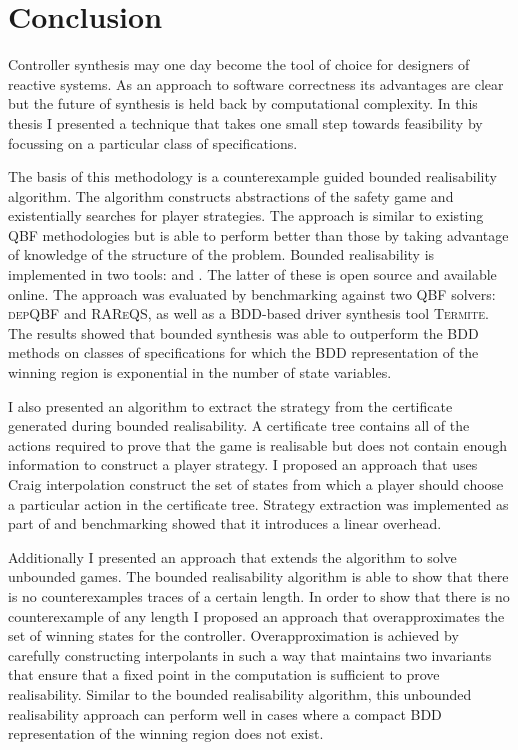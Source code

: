 \chapter{Conclusion}
\label{ch:conclusion}

Controller synthesis may one day become the tool of choice for designers of reactive systems. As an approach to software correctness its advantages are clear but the future of synthesis is held back by computational complexity. In this thesis I presented a technique that takes one small step towards feasibility by focussing on a particular class of specifications.

The basis of this methodology is a counterexample guided bounded realisability algorithm. The algorithm constructs abstractions of the safety game and existentially searches for player strategies. The approach is similar to existing QBF methodologies but is able to perform better than those by taking advantage of knowledge of the structure of the problem. Bounded realisability is implemented in two tools: \eva and \termitesat. The latter of these is open source and available online. The approach was evaluated by benchmarking \eva against two QBF solvers: \textsc{depQBF} and \textsc{RAReQS}, as well as a BDD-based driver synthesis tool \textsc{Termite}. The results showed that bounded synthesis was able to outperform the BDD methods on classes of specifications for which the BDD representation of the winning region is exponential in the number of state variables.

I also presented an algorithm to extract the strategy from the certificate generated during bounded realisability. A certificate tree contains all of the actions required to prove that the game is realisable but does not contain enough information to construct a player strategy. I proposed an approach that uses Craig interpolation construct the set of states from which a player should choose a particular action in the certificate tree.  Strategy extraction was implemented as part of \eva and benchmarking showed that it introduces a linear overhead.

Additionally I presented an approach that extends the algorithm to solve unbounded games. The bounded realisability algorithm is able to show that there is no counterexamples traces of a certain length. In order to show that there is no counterexample of any length I proposed an approach that overapproximates the set of winning states for the controller. Overapproximation is achieved by carefully constructing interpolants in such a way that maintains two invariants that ensure that a fixed point in the computation is sufficient to prove realisability.  Similar to the bounded realisability algorithm, this unbounded realisability approach can perform well in cases where a compact BDD representation of the winning region does not exist. 

